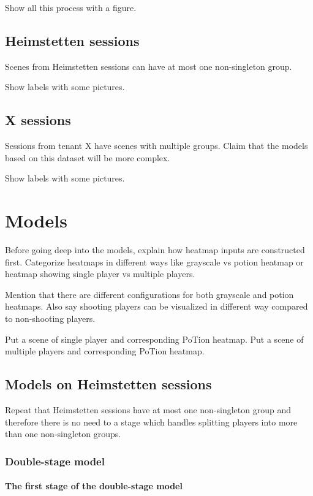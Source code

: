 \documentclass[doctype=mastersthesis,lang=english,BCOR=15mm,biblatex]{ldvbook}
\begin{document}
Show all this process with a figure.

\section{Heimstetten sessions}

Scenes from Heimstetten sessions can have at most one non-singleton group.

Show labels with some pictures.

\section{X sessions}

Sessions from tenant X have scenes with multiple groups. Claim that the models based on this dataset will be more complex.

Show labels with some pictures.

\chapter{Models}

Before going deep into the models, explain how heatmap inputs are constructed first. Categorize heatmaps in different ways like grayscale vs potion heatmap or heatmap showing single player vs multiple players.

Mention that there are different configurations for both grayscale and potion heatmaps. Also say shooting players can be visualized in different way compared to non-shooting players.

Put a scene of single player and corresponding PoTion heatmap.
Put a scene of multiple players and corresponding PoTion heatmap.

\section{Models on Heimstetten sessions}

Repeat that Heimstetten sessions have at most one non-singleton group and therefore there is no need to a stage which handles splitting players into more than one non-singleton groups.

\subsection{Double-stage model}

\subsubsection{The first stage of the double-stage model}
\end{document}
